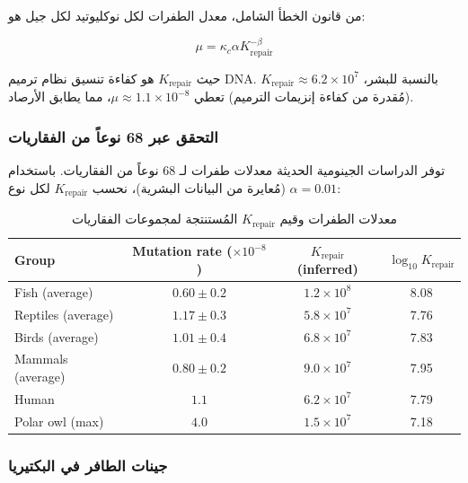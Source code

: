 \documentclass[11pt,a4paper]{article}
\newcommand{\kappac}{\kappa_c}
\begin{document}
	من قانون الخطأ الشامل، معدل الطفرات لكل نوكليوتيد لكل جيل هو:
	
	\begin{equation}
		\mu = \kappac \alpha K_{\text{repair}}^{-\beta}
		\label{eq:mutation-rate}
	\end{equation}
	
	حيث \(K_{\text{repair}}\) هو كفاءة تنسيق نظام ترميم DNA. بالنسبة للبشر، \(K_{\text{repair}} \approx 6.2 \times 10^7\) (مُقدرة من كفاءة إنزيمات الترميم) تعطي \(\mu \approx 1.1 \times 10^{-8}\)، مما يطابق الأرصاد.
	
	\subsubsection{التحقق عبر 68 نوعاً من الفقاريات}
	
	توفر الدراسات الجينومية الحديثة معدلات طفرات لـ 68 نوعاً من الفقاريات. باستخدام \(\alpha = 0.01\) (مُعايرة من البيانات البشرية)، نحسب \(K_{\text{repair}}\) لكل نوع:
	
	\begin{table}[htbp]
		\begin{otherlanguage}{english}
			\centering
			\caption{Mutation rates and inferred \(K_{\text{repair}}\) for vertebrate groups}
			\label{tab:vertebrate-mutations}
			\small
			\begin{tabular}{lccc}
				\toprule
				\textbf{Group} & \textbf{Mutation rate ($\times 10^{-8}$)} & \textbf{$K_{\text{repair}}$ (inferred)} & $\log_{10} K_{\text{repair}}$ \\
				\midrule
				Fish (average) & $0.60 \pm 0.2$ & $1.2 \times 10^8$ & 8.08 \\
				Reptiles (average) & $1.17 \pm 0.3$ & $5.8 \times 10^7$ & 7.76 \\
				Birds (average) & $1.01 \pm 0.4$ & $6.8 \times 10^7$ & 7.83 \\
				Mammals (average) & $0.80 \pm 0.2$ & $9.0 \times 10^7$ & 7.95 \\
				Human & $1.1$ & $6.2 \times 10^7$ & 7.79 \\
				Polar owl (max) & $4.0$ & $1.5 \times 10^7$ & 7.18 \\
				\bottomrule
			\end{tabular}
		\end{otherlanguage}
		\caption{معدلات الطفرات وقيم \(K_{\text{repair}}\) المُستنتجة لمجموعات الفقاريات}
	\end{table}
	
	\subsubsection{جينات الطافر في البكتيريا}
	
\end{document}
